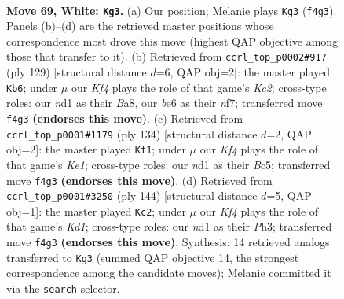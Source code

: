 \documentclass[11pt]{article}
\begin{document}
\clearpage

\begin{figure}[p]\centering
\begin{subfigure}{0.46\textwidth}\centering
\resizebox{\linewidth}{!}{%
\newchessgame
\chessboard[
  setfen={1k6/8/4b3/P7/1P3K2/8/8/3n4 w - - 4 69},
  showmover=false,
  pgfstyle=straightmove, color=movearrow, markmove={f4-g3}
]}
\caption{}
\end{subfigure}\hfill
\begin{subfigure}{0.46\textwidth}\centering
\resizebox{\linewidth}{!}{%
\newchessgame
\chessboard[
  setfen={b7/2k2N2/8/6p1/7p/8/8/6K1 b - - 1 65},
  showmover=false,
  pgfstyle=straightmove, color=movearrow, markmove={c7-b6}
]}
\caption{}
\end{subfigure}
\\[4pt]
\begin{subfigure}{0.46\textwidth}\centering
\resizebox{\linewidth}{!}{%
\newchessgame
\chessboard[
  setfen={8/8/5k2/2B5/8/1P3b2/P7/4K3 w - - 9 68},
  showmover=false,
  pgfstyle=straightmove, color=movearrow, markmove={e1-f1}
]}
\caption{}
\end{subfigure}\hfill
\begin{subfigure}{0.46\textwidth}\centering
\resizebox{\linewidth}{!}{%
\newchessgame
\chessboard[
  setfen={8/8/8/7P/4k1P1/7P/1b6/3K4 w - - 3 73},
  showmover=false,
  pgfstyle=straightmove, color=movearrow, markmove={d1-c2}
]}
\caption{}
\end{subfigure}
\caption{\textbf{Move 69, White: \texttt{Kg3}.} (a) Our position; Melanie plays \texttt{Kg3} (\texttt{f4g3}). Panels (b)--(d) are the retrieved master positions whose correspondence most drove this move (highest QAP objective among those that transfer to it). (b) Retrieved from \texttt{ccrl\_top\_p0002\#917} (ply 129) [structural distance $d$=6, QAP obj=2]: the master played \texttt{Kb6}; under $\mu$ our \emph{Kf4} plays the role of that game's \emph{Kc2}; cross-type roles: our \emph{n}d1 as their \emph{B}a8, our \emph{b}e6 as their \emph{n}f7; transferred move \texttt{f4g3} \textbf{(endorses this move)}. (c) Retrieved from \texttt{ccrl\_top\_p0001\#1179} (ply 134) [structural distance $d$=2, QAP obj=2]: the master played \texttt{Kf1}; under $\mu$ our \emph{Kf4} plays the role of that game's \emph{Ke1}; cross-type roles: our \emph{n}d1 as their \emph{B}c5; transferred move \texttt{f4g3} \textbf{(endorses this move)}. (d) Retrieved from \texttt{ccrl\_top\_p0001\#3250} (ply 144) [structural distance $d$=5, QAP obj=1]: the master played \texttt{Kc2}; under $\mu$ our \emph{Kf4} plays the role of that game's \emph{Kd1}; cross-type roles: our \emph{n}d1 as their \emph{P}h3; transferred move \texttt{f4g3} \textbf{(endorses this move)}. Synthesis: 14 retrieved analogs transferred to \texttt{Kg3} (summed QAP objective 14, the strongest correspondence among the candidate moves); Melanie committed it via the \texttt{search} selector.}
\label{fig:thought-m136}
\end{figure}
\end{document}
